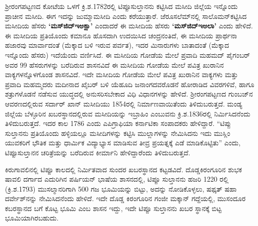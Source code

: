 ಶ‍್ರೀರಂಗಪಟ್ಟಣದ ಕೋಟೆಯ ಒಳಗೆ ಕ್ರಿ.ಶ.1782ರಲ್ಲಿ ಟಿಪ್ಪೂಸುಲ್ತಾನನು ಕಟ್ಟಿಸಿದ ಮಸೀದಿ ಜಿಲ್ಲೆಯ ಇನ್ನೊಂದು ಪ್ರಾಚೀನ ಮಸೀದಿ. ಈಗ ಇದನ್ನು ಜುಮ್ಮಾಮಸೀದಿ ಎಂದು ಕರೆಯುತ್ತಾರೆ. ಜೆರೂಸಲೆಮ್‌ನಲ್ಲಿ ಸಾಲೊಮನ್​ ಕಟ್ಟಿಸಿದ ಮಸೀದಿಯ ಹೆಸರು \textbf{‘ಮಸ್​ಜಿದ್​\general{\enginline{-}}ಇ\general{\enginline{-}}ಅಕ್ಷಾ’} ಎಂದಾದರೆ ಈ ಮಸೀದಿಯ ಹೆಸರು \textbf{‘ಮಸ್​ಜಿದ್​\general{\enginline{-}}ಇ\general{\enginline{-}}ಅಲಾ’} ಎಂದು ಹೇಳಿದೆ. ಈ ಮಸೀದಿಯ ಪ್ರತಿಯೊಂದು ಕಮಾನೂ ಹೊಸದಾಗಿ ಉದಯಿಸಿದ ಚಂದ್ರನಂತಿದೆ, ಈ ಮಸೀದಿಯ ಪ್ರಾರ್ಥನಾ ಹಜಾರವು ಮಾರ್ವಾದಂತೆ (ಮೆಕ್ಕಾದ ಬಳಿ ಇರುವ ಪರ್ವತ), ಇದರ ಮಿನಾರುಗಳು ಬಾತಾದಂತೆ (ಮೆಕ್ಕಾದ ಇನ್ನೊಂದು ಹೆಸರು) ಇದೆಯೆಂದು ವರ್ಣಿಸಿದೆ. ಈ ಮಸೀದಿಯ ಗೋಡೆಯ ಮೇಲೆ ಪ್ರವಾದಿ ಮಹಮದ್​ ಪೈಗಂಬರ್​ ಅವರ 99 ಹೆಸರುಗಳನ್ನು ಬರೆದಿರುವ ಶಾಸನವಿದೆ ಈ ಮಸೀದಿಯ ಗೋಡೆಯ ಮೇಲೆ ಪವಿತ್ರ ಖುರಾನಿನ ವಾಕ್ಯಗಳನ್ನೊಳಗೊಂಡ ಶಾಸನವಿದೆ. ಇದೇ ಮಸೀದಿಯ ಗೋಡೆಯ ಮೇಲೆ ಪವಿತ್ರ ಖುರಾನಿನ ವಾಕ್ಯಗಳು ಮತ್ತು ಪ್ರವಾದಿ ಮಹಮ್ಮದರು ಮದೀನಾದ ಖೈಬರ್​ ಬಳಿ ಯೆಹೂದಿ ಜನಾಂಗದವರೊಡನೆ ಹೋರಾಡಿದ ವಿವರಗಳಿವೆ, ಹಾಗೂ ಶತ್ರುಗಳೊಡನೆ ನಡೆಸುವ ಯುದ್ಧದಲ್ಲಿ ಅನುಸರಿಸಬೇಕಾದ ವಿಧಿ ವಿಧಾನಗಳನ್ನು ಹೇಳಿದೆ. ಶ‍್ರೀರಂಗಪಟ್ಟಣದ ಗುಂಬಜ್​ನ ಆವರಣದಲ್ಲಿರುವ ಸರ್ದಾರ್​ ಖಾನ್​ ಮಸೀದಿಯು 1854ರಲ್ಲಿ ನಿರ್ಮಾಣವಾಯಿತೆಂದು ತಿಳಿದುಬರುತ್ತದೆ. ಮಂಡ್ಯ ಜಿಲ್ಲೆಯ ಬೆಳ್ಳೂರಿನ ಖಬರಸ್ಥಾನದಲ್ಲಿರುವ ಮಸೀದಿಯನ್ನು ಇಬ್ರಾಹಿಂ ಎಂಬುವನು ಕ್ರಿ.ಶ.1836ರಲ್ಲಿ ನಿರ್ಮಿಸಿದನೆಂದು ತಿಳಿದುಬರುತ್ತದೆ. ಇದರ ಕಾಲ 1786 ಎಂದು ಎಪಿಗ್ರಾಫಿಯಾ ಕರ್ನಾಟಿಕಾ ಸಂಪಾದಕರು ಹೇಳಿದ್ದಾರೆ. “ಟಿಪ್ಪು ಸುಲ್ತಾನನು ಪ್ರತಿಯೊಂದು ಹಳ್ಳಿಯಲ್ಲೂ ಮಸೀದಿಗಳನ್ನು ಕಟ್ಟಿಸಿ ಮುಲ್ಲಾಗಳನ್ನು ನೇಮಿಸಿದನು ಇದು ಮುಸ್ಲಿಂ ಯುವಕರಿಗೆ ಭೌತಿಕ ಮತ್ತು ಧಾರ್ಮಿಕ ವಿದ್ಯಾಭ್ಯಾಸ ಮಾಡಿಸುವ ತೀವ್ರ ಪ್ರಯತ್ನಕ್ಕೆ ಎಡೆ ಮಾಡಿಕೊಟ್ಟಿತು” ಎಂದು, ಟಿಪ್ಪೂಸುಲ್ತಾನನ ಚರಿತ್ರೆಯನ್ನು ಬರೆದಿರುವ ಕೀರ್ಮಾನಿ ಹೇಳಿದ್ದಾರೆಂದು ತಿಳಿದುಬರುತ್ತದೆ.

\vskip -2pt

ಕಿರುಗಾವಲಿನಲ್ಲಿ ಟಿಪ್ಪೂ ಕಾಲದಲ್ಲಿ ನಿರ್ಮಿತವಾದ ಸುಂದರ ಖಬರಸ್ಥಾನದ ಕಟ್ಟಡವಿದೆ. ದೊಡ್ಡಕಿರಂಗೂರಿನ ಶುಭಕ ಷಾವಲಿ ದರ್ಗಾದ ಎದುರಿಗಿನ ಪರ್ಷಿಯನ್​ ಭಾಷೆಯ ಶಾಸನದಲ್ಲಿ, ಟಿಪ್ಪೂ ಸುಲ್ತಾನನು ಹಜರಿ 1220 ರಲ್ಲಿ (ಕ್ರಿ.ಶ.1793) ಮುಸಲ್ಮಾನರಿಗಾಗಿ 500 ಗಜ ಭೂಮಿಯನ್ನು ಬಿಟ್ಟು, ಅದನ್ನು ನೋಡಿಕೊಳ್ಳಲು, ಷಫ್ಕತ್​ ಷಹಾ ದರ್ವೇಶ್​ನನ್ನು ನೇಮಿಸಿದನೆಂದು ಹೇಳಿದೆ. ಇದೇ ದೊಡ್ಡ ಕಿರಂಗೂರಿನ ಗಂಜೀ ಮಕ್ಕಾನ್​ ಗದ್ದೆಯಲ್ಲಿ, ಮುಸಂದೂರ ಕಬರಸ್ಥಾನದ ಬಗೆ ಕೊಟ್ಟ ಭೂಮಿ ಎಂಬ ಶಾಸನ ಇದ್ದು, ಇದೇ ಟಿಪ್ಪೂ ಸುಲ್ತಾನನು ಖಬರ ಸ್ಥಾನಕ್ಕೆ ಬಿಟ್ಟ ಭೂಮಿಯಾಗಿರಬಹುದು.

